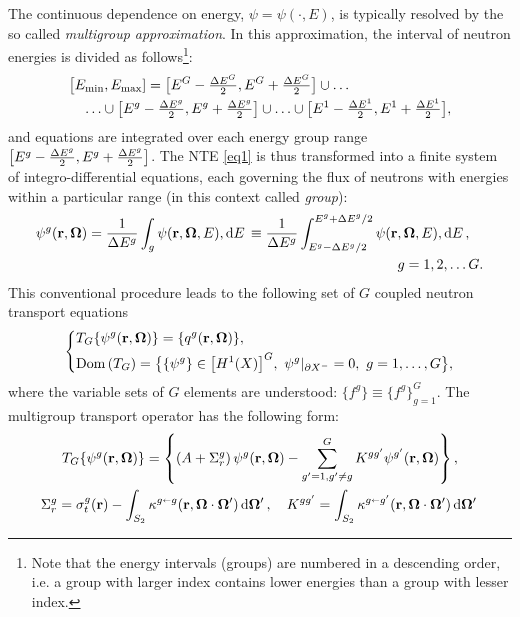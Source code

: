 The continuous dependence on energy, $\psi = \psi(\cdot, E)$, is typically resolved by the so called \textit{multigroup
approximation}. In this approximation, the interval of neutron energies is divided as follows\footnote{Note that the
energy intervals (groups) are numbered in a descending order, i.e. a group with larger index contains lower energies than a group with
lesser index.}:
$$
\begin{multlined}
  \bigl[\Emin,\Emax] = \bigl[E^{G}-\dEh{G},E^{G}+\dEh{G}\bigr]\cup \ldots\\
  \ldots \cup \bigl[E^{g}-\dEh{g}, E^{g}+\dEh{g}\bigr] \cup \ldots \cup
  \bigl[E^1-\dEh{1},E^{1}+\dEh{1}\bigr],
\end{multlined} 
$$
and equations  are integrated over each energy group range 
\linebreak
\mbox{$\bigl[E^{g}-\dEh{g}, E^{g}+\dEh{g}\bigr]$}.
The NTE \eqref{eq1} is thus transformed into a finite system of integro-differential
equations, each governing the flux of neutrons with energies within a particular range (in this context called
\textit{group}):
\begin{equation}\label{eq:psi-MG}
\begin{multlined}
  \psi^g(\br, \bomega) = \frac{1}{\Delta E^{g}}\int_{g}\psi(\br, \bomega, E),\d{E} \equiv
  \frac{1}{\Delta E^{g}}\int_{E^g-\Delta E^{g}/2}^{E^g+\Delta E^{g}/2}\psi(\br, \bomega, E),\d{E},\\ g = 1, 2,\ldots
  G.
\end{multlined}
\end{equation} 
This conventional procedure leads to the following set of $G$ coupled neutron transport equations
\begin{equation}\label{eq:mg}
	\left\{
	  \begin{aligned}
      &T_G\{\psi^g(\br,\bomega)\} = \{q^g(\br,\bomega)\},\\
      &\Dom{T_G} = \bigl\{\{\psi^g\}\in \bigl[\Hp[1](X)\bigr]^G,\ \psi^g\vert_{\pX[-]} = 0,\ g = 1,\ldots,G\bigr\},
    \end{aligned}
  \right.\\[.2em]
\end{equation}
where the variable sets of $G$ elements are understood: $\{f^g\} \equiv \{f^g\}_{g=1}^G$. The multigroup transport
operator has the following form:
\begin{equation*}
\begin{gathered}
    T_G\{\psi^g(\br,\bomega)\} = \left\{\left(A + \Sigma_r^g\right)\psi^g(\br,\bomega) - \summ{g'=1,g'\neq g}{G}
    K^{gg'}\psi^{g'}(\br,\bomega)\right\},\\
    \Sigma_r^g = \sigma_t^g(\br) - \intA[']{\kappa^{g\sla g}(\br,\bomega\cdot\bomega')},\quad K^{gg'} = 
    \intA[']{\kappa^{g\sla g'}(\br,\bomega\cdot\bomega')}
\end{gathered}
\end{equation*}
